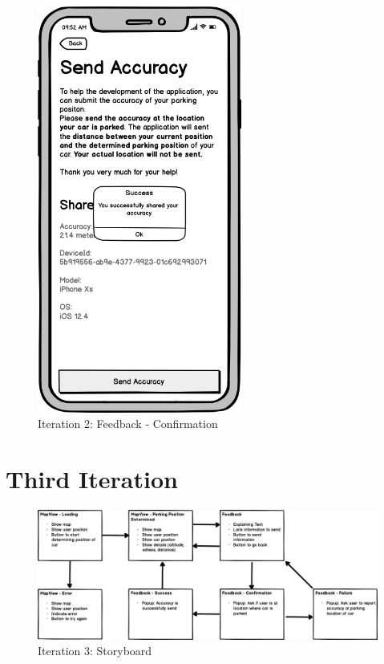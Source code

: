 \begin{figure}[H]
  \centering
  \begin{minipage}[b]{0.45\textwidth}
    \centering
    \includegraphics[width=0.6\textwidth]{images/UI/Iteration2-Feedback-Confirmation.png}
    \caption{Iteration 2: Feedback - Confirmation}
    \label{fig:i2-feedback-con}
  \end{minipage}
  \hfill
  \begin{minipage}[b]{0.45\textwidth}
    
  \end{minipage}
\end{figure}

\section*{Third Iteration}

\begin{figure}[H]
    \centering
    \includegraphics[width=\textwidth]{images/UI/Iteration3-Overview.png}
    \caption{Iteration 3: Storyboard}
    \label{fig:i3story}
\end{figure}

